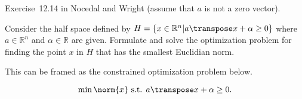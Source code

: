 \begin{problem}\label{prob:03}%
  Exercise~12.14 in Nocedal and Wright (assume that $a$ is not a zero vector).
  
  Consider the half space defined by $H=\{x\in \mathbb{R}^n \vert a\transpose x + \alpha \geq 0 \}$ where $a\in \mathbb{R}^n$ and $\alpha \in \mathbb{R}$ are given.  Formulate and solve the optimization problem for finding the point $x$ in $H$ that has the smallest Euclidian norm.
\end{problem}

This can be framed as the constrained optimization problem below.

\[ \min \norm{x} \text{ s.t. } a\transpose x + \alpha \ge 0 \text{.}\]




